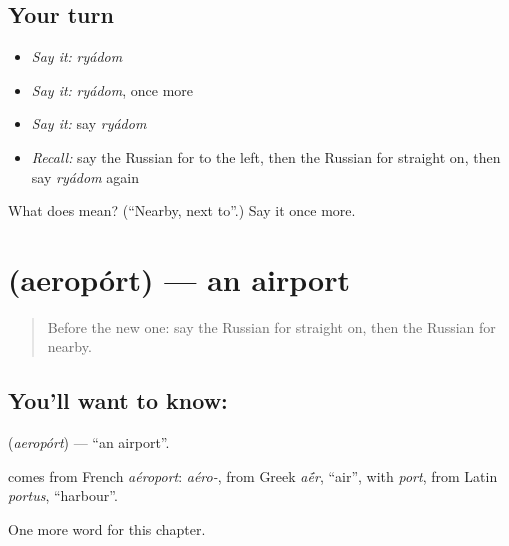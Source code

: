 \subsection*{Your turn}
\begin{itemize}
\raggedright
  \item \emph{Say it:} \emph{ryádom}
  \item \emph{Say it:} \emph{ryádom}, once more
  \item \emph{Say it:} say \emph{ryádom}
  \item \emph{Recall:} say the Russian for to the left, then the Russian for straight on, then say \emph{ryádom} again
\end{itemize}

\begin{tcolorbox}[breakable,colback=teal!4,colframe=teal!35!black,title={Before you move on}]
What does  mean? (\textquotedblleft{}Nearby, next to\textquotedblright{}.) Say it once more.
\end{tcolorbox}
\section[\texorpdfstring{\ru{аэропорт} (aeropórt)}{аэропорт (aeropórt)}]{ (aeropórt) — an airport}

\label{lesson:RU-C87-airport}



\begin{quote}
Before the new one: say the Russian for straight on, then the Russian for nearby.
\end{quote}

\subsection*{You'll want to know: }
\textbf{} (\emph{aeropórt}) — \textquotedblleft{}an airport\textquotedblright{}.

\begin{cousinweb}
\textbf{} comes from French \emph{aéroport}: \emph{aéro-}, from Greek \emph{a\'{\={e}}r}, \textquotedblleft{}air\textquotedblright{}, with \emph{port}, from Latin \emph{portus}, \textquotedblleft{}harbour\textquotedblright{}.
\end{cousinweb}

\begin{grammarlens}[title={What you've built}]
One more word for this chapter.
\end{grammarlens}

